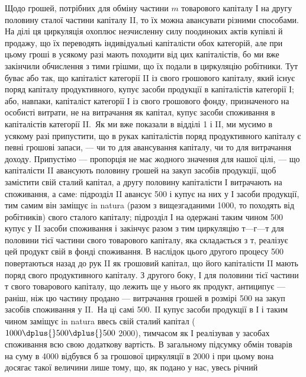 Щодо грошей, потрібних для обміну частини $m$ товарового капіталу
І на другу половину сталої частини капіталу II, то їх можна авансувати
різними способами. На ділі ця циркуляція охоплює незчисленну силу поодиноких
актів купівлі й продажу, що їх переводять індивідуальні капіталісти
обох категорій, але при цьому гроші в усякому разі мають походити
від цих капіталістів, бо ми вже закінчили обчислення з тими
грішми, що їх подали в циркуляцію робітники. Тут буває або так, що
капіталіст категорії II із свого грошового капіталу, який існує поряд капіталу
продуктивного, купує засоби продукції в капіталістів категорії І;
або, навпаки, капіталіст категорії І із свого грошового фонду, призначеного
на особисті витрати, не на витрачання як капітал, купує засоби
споживання в капіталістів категорії II.~Як ми вже показали в відділі 1 і
II, ми мусимо в усякому разі припустити, що в руках капіталістів поряд
продуктивного капіталу є певні грошові запаси, — чи то для авансування
капіталу, чи то для витрачання доходу. Припустімо — пропорція не має
жодного значення для нашої цілі, — що капіталісти II авансують половину
грошей на закуп засобів продукції, щоб замістити свій сталий капітал,
а другу половину капіталісти І витрачають на споживання, а саме: підрозділ
II авансує 500 і купує на них у І засоби продукції,
тим самим він заміщує in natura (разом з вищезгаданими 1000,
то походять від робітників)  свого сталого капіталу; підрозділ І на
одержані таким чином 500 купує у II засоби споживання
і закінчує разом з тим циркуляцію $т — г — т$ для половини тієї частини
свого товарового капіталу, яка складається з $т$, реалізує цей продукт
свій в фонді споживання. В наслідок цього другого процесу 500
повертаються назад до рук II як грошовий капітал, що його капіталісти
II мають поряд свого продуктивного капіталу. З другого боку, І для
половини тієї частини $т$ свого товарового капіталу, що лежить ще у
нього як продукт, антиципує — раніш, ніж цю частину продано — витрачання
грошей в розмірі 500 на закуп засобів споживання у II.~На ці самі 500. II купує засоби продукції в І і таким чином
заміщує in natura ввесь свій сталий капітал ($1000 \dplus{} 500 \dplus{} 500$ \deq{} 2000),
тимчасом як І реалізував у засобах споживання всю свою додаткову
вартість. В загальному підсумку обмін товарів на суму в 4000
відбувся б за грошової циркуляції в 2000 і при цьому вона
досягає такої величини лише тому, що, як подано у нас, увесь річний
